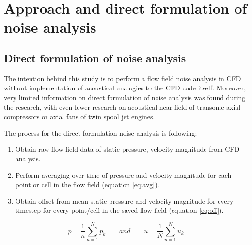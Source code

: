 
\chapter{Approach and direct formulation of noise analysis} %
\label{approach} %


\section{Direct formulation of noise analysis} \label{direct_approach}
The intention behind this study is to perform a flow field noise analysis in CFD without implementation of acoustical analogies to the CFD code itself. Moreover, very limited information on direct formulation of noise analysis was found during the research, with even fewer research on acoustical near field of transonic axial compressors or axial fans of twin spool jet engines.

The process for the direct formulation noise analysis is following:
\begin{enumerate}
\item Obtain raw flow field data of static pressure, velocity magnitude from CFD analysis.
\item Perform averaging over time of pressure and velocity magnitude for each point or cell in the flow field (equation \ref{eq:avg}).
\item Obtain offset from mean static pressure and velocity magnitude for every timestep for every point/cell in the saved flow field (equation \ref{eq:off}).		
\end{enumerate}


\begin{equation} \label{eq:avg}
\bar{p} = \frac{1}{n} \sum_{n=1}^{N} p_k \qquad and \qquad \bar{u} = \frac{1}{N} \sum_{n=1}^{N} u_k
\end{equation}

